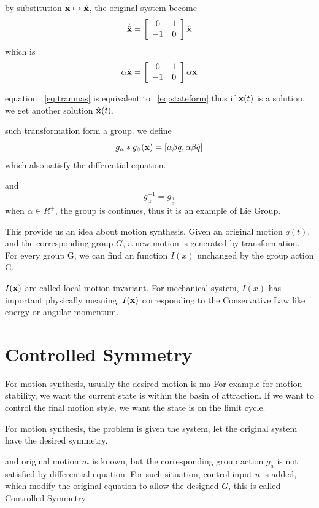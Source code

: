 by substitution $\mathbf{x} \mapsto \hat{\mathbf{x}}$, the original system become
\[ 
\dot{\hat{\mathbf{x}}}=
\left[ 
\begin{array}{cc}
0 &1\\
-1 &0 
\end{array}
\right]\hat{\mathbf{x}}
\]
which is 
\begin{equation}
\label{eq:tranmas} 
\alpha \dot{\mathbf{x}}=
\left[ 
\begin{array}{cc}
0 &1\\
-1 &0 
\end{array}
\right]\alpha \mathbf{x}
\end{equation}

equation ~\ref{eq:tranmas} is equivalent to  ~\ref{eq:stateform}
thus if $\mathbf{x}(t)$ is a solution, we get another solution $\hat{\mathbf{x}}(t)$.

such transformation form a group.
we define 
\[
g_{\alpha}*g_{\beta}(\mathbf{x})=[\alpha \beta q, \alpha \beta \dot{q}]
\]
which also satisfy the differential equation.

and 
\[
g_{\alpha}^{-1}=g_{\frac{1}{\alpha}}
\]
when $\alpha \in R^+$, the group is continues,
thus it is an example of Lie Group.





This provide us an idea about motion synthesis.
Given an original motion $q(t)$, and the corresponding group $G$, a new motion is generated by transformation.
For every group G, we can find an function $I(x)$ unchanged by the group action G, 

$I(\mathbf{x})$ are called local motion invariant. 
For mechanical system,  $I(x)$ has important physically meaning. 
$I(\mathbf{x})$ corresponding to the Conservative Law like energy or angular momentum.


\section{Controlled Symmetry}
For motion synthesis, usually the desired motion is ma
For example for motion stability, we want the current state is within the basin of attraction.
If we want to control the final motion style, we want the state is on the limit cycle.

For motion synthesis, the problem is given the system, let the original system have the desired symmetry.

 and original motion $m$ is known, but the corresponding group action $g_a$ is not satisfied by differential equation.
For such situation, control input $u$  is added, which modify the original equation to allow the designed $G$, this is called Controlled Symmetry.

